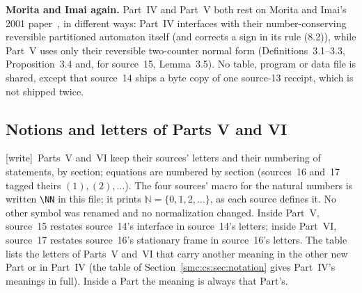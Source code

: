 \documentclass[11pt,letterpaper]{article}
\numberwithin{equation}{section}
\theoremstyle{definition}
\theoremstyle{remark}
\newcommand{\NN}{\mathbb N}
\newcommand{\wtag}{\textup{[write]}}
\begin{document}
\textbf{Morita and Imai again.} Part~IV and Part~V both rest on Morita and Imai's 2001 paper~\cite{moritaimai}, in different ways: Part~IV interfaces with their number-conserving reversible partitioned automaton itself (and corrects a sign in its rule (8.2)), while Part~V uses only their reversible two-counter normal form (Definitions~3.1--3.3, Proposition~3.4 and, for source~15, Lemma~3.5). No table, program or data file is shared, except that source~14 ships a byte copy of one source-13 receipt, which is not shipped twice.

\subsection{Notions and letters of Parts V and VI}\label{smc:tm:sec:notation}

\wtag\ Parts~V and~VI keep their sources' letters and their numbering of statements, by section; equations are numbered by section (sources~16 and~17 tagged theirs $(1),(2),\ldots$). The four sources' macro for the natural numbers is written \verb|\NN| in this file; it prints $\NN=\{0,1,2,\ldots\}$, as each source defines it. No other symbol was renamed and no normalization changed. Inside Part~V, source~15 restates source~14's interface in source~14's letters; inside Part~VI, source~17 restates source~16's stationary frame in source~16's letters. The table lists the letters of Parts~V and~VI that carry another meaning in the other new Part or in Part~IV (the table of Section~\ref{smc:cs:sec:notation} gives Part~IV's meanings in full). Inside a Part the meaning is always that Part's.
\end{document}
